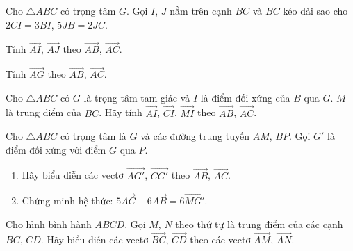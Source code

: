 \begin{bt}%
	Cho $\triangle ABC$ có trọng tâm $G$. Gọi $I$, $J$ nằm trên cạnh $BC$ và $BC$ kéo dài sao cho $2CI=3BI$, $5JB=2JC$.
	\begin{enumEX}{2}
		\item Tính $\overrightarrow{AI}$, $\overrightarrow{AJ}$ theo $\overrightarrow{AB}$, $\overrightarrow{AC}$.	
		\item Tính $\overrightarrow{AG}$ theo $\overrightarrow{AB}$, $\overrightarrow{AC}$.
	\end{enumEX}
\end{bt}

\begin{bt}%
	Cho $\triangle ABC$ có $G$ là trọng tâm tam giác và $I$ là điểm đối xứng của $B$ qua $G$. $M$ là trung điểm của $BC$. Hãy tính $\overrightarrow{AI}$, $\overrightarrow{CI}$, $\overrightarrow{MI}$ theo $\overrightarrow{AB}$, $\overrightarrow{AC}$.
\end{bt}

\begin{bt}%
	Cho $\triangle ABC$ có trọng tâm là $G$ và các đường trung tuyến $AM$, $BP$. Gọi $G'$ là điểm đối xứng với điểm $G$ qua $P$.
	\begin{enumerate}
		\item Hãy biểu diễn các vectơ $\overrightarrow{AG'}$, $\overrightarrow{CG'}$ theo $\overrightarrow{AB}$, $\overrightarrow{AC}$.
		\item Chứng minh hệ thức: $5\overrightarrow{AC}-6\overrightarrow{AB}=6\overrightarrow{MG'}$.
	\end{enumerate}
\end{bt}

\begin{bt}%
	Cho hình bình hành $ABCD$. Gọi $M$, $N$ theo thứ tự là trung điểm của các cạnh $BC$, $CD$. Hãy biểu diễn các vectơ $\overrightarrow{BC}$, $\overrightarrow{CD}$ theo các vectơ $\overrightarrow{AM}$, $\overrightarrow{AN}$.
\end{bt}


